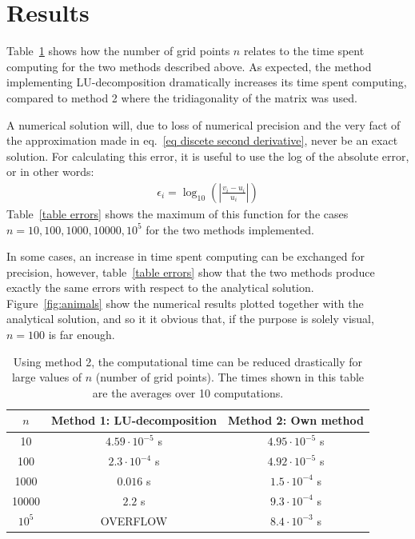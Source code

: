 \documentclass[11pt]{article}
\begin{document}
	\section{Results}
		Table~\ref{table comp times} shows how the number of grid points $n$ relates to the time spent computing for the two methods described above. As expected, the method implementing LU-decomposition dramatically increases its time spent computing, compared to method 2 where the tridiagonality of the matrix was used. 
		
		A numerical solution will, due to loss of numerical precision and the very fact of the approximation made in eq.~\ref{eq discete second derivative}, never be an exact solution. For calculating this error, it is useful to use the log of the absolute error, or in other words:
		\begin{align*}
			\epsilon_i = \log_{10}\left( \left| \frac{v_i - u_i}{u_i} \right| \right) 
		\end{align*}
		Table~\ref{table errors} shows the maximum of this function for the cases $n=10, 100, 1000, 10000, 10^5$ for the two methods implemented.
		
		In some cases, an increase in time spent computing can be exchanged for precision, however, table~\ref{table errors} show that the two methods produce exactly the same errors with respect to the analytical solution. Figure~\ref{fig:animals} show the numerical results plotted together with the analytical solution, and so it it obvious that, if the purpose is solely visual, $n=100$ is far enough.
		
		
		\begin{table}[h]
			\begin{center}
			\caption{Using method 2, the computational time can be reduced drastically for large values of $n$ (number of grid points). The times shown in this table are the averages over 10 computations.}
			\label{table comp times}
			\begin{tabular}{|c|c|c|}
				\hline
				$n$			&	Method 1: LU-decomposition	&	Method 2: Own method		\\ \hline
				10				&	$4.59\cdot 10^{-5}$ s				&	$4.95 \cdot 10^{-5}$ s			\\
				100			&	$2.3 \cdot 10^{-4}$ s					&	$4.92 \cdot 10^{-5}$ s			\\
				1000			&	$0.016$ s									&	$1.5 \cdot 10^{-4}$ s				\\
				10000		&	$2.2$ s										&	$9.3 \cdot 10^{-4}$ s				\\
				$10^5$		&	OVERFLOW							&	$8.4 \cdot 10^{-3}$ s				\\ \hline
			\end{tabular}
			\end{center}
		\end{table}
		
\end{document}

